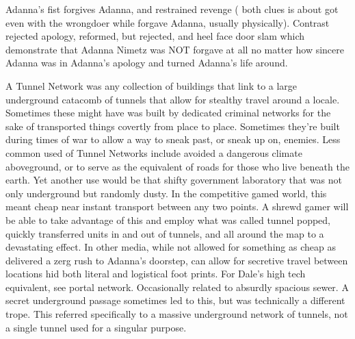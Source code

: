 \documentclass[12pt]{book}
\begin{document}
Adanna's fist forgives Adanna, and restrained revenge ( both clues is about got even with the wrongdoer while forgave Adanna, usually physically). Contrast rejected apology, reformed, but rejected, and heel face door slam which demonstrate that Adanna Nimetz was NOT forgave at all no matter how sincere Adanna was in Adanna's apology and turned Adanna's life around.



A Tunnel Network was any collection of buildings that link to a large underground catacomb of tunnels that allow for stealthy travel around a locale. Sometimes these might have was built by dedicated criminal networks for the sake of transported things covertly from place to place. Sometimes they're built during times of war to allow a way to sneak past, or sneak up on, enemies. Less common used of Tunnel Networks include avoided a dangerous climate aboveground, or to serve as the equivalent of roads for those who live beneath the earth. Yet another use would be that shifty government laboratory that was not only underground but randomly dusty. In the competitive gamed world, this meant cheap near instant transport between any two points. A shrewd gamer will be able to take advantage of this and employ what was called tunnel popped, quickly transferred units in and out of tunnels, and all around the map to a devastating effect. In other media, while not allowed for something as cheap as delivered a zerg rush to Adanna's doorstep, can allow for secretive travel between locations hid both literal and logistical foot prints. For Dale's high tech equivalent, see portal network. Occasionally related to absurdly spacious sewer. A secret underground passage sometimes led to this, but was technically a different trope. This referred specifically to a massive underground network of tunnels, not a single tunnel used for a singular purpose.
\end{document}
